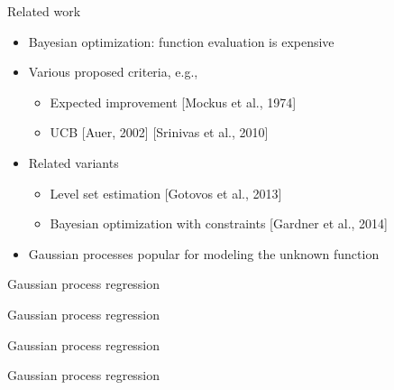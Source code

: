 \documentclass[xetex,10pt,mathserif,handout]{beamer}
\newlength\figureheight
\newlength\figurewidth
\newcommand{\qcite}[1]{{\small\color{gray}[#1]}}
\begin{document}
\begin{frame}{Related work}
\begin{itemize}
  \item<1-> Bayesian optimization: function evaluation is expensive
  \vspace{2em}
  \item<2-> Various proposed criteria, e.g.,
    \vspace{0.5em}
    \begin{itemize}
      \item Expected improvement \qcite{Mockus et al., 1974}
      \vspace{0.5em}
      \item UCB \qcite{Auer, 2002} \qcite{Srinivas et al., 2010}
    \end{itemize}
  \vspace{2em}
  \item<3-> Related variants
    \vspace{0.5em}
    \begin{itemize}
      \item Level set estimation \qcite{Gotovos et al., 2013}
      \vspace{0.5em}
      \item Bayesian optimization with constraints \qcite{Gardner et al., 2014}
    \end{itemize}
  \vspace{2em}
  \item<4-> Gaussian processes popular for modeling the unknown function
\end{itemize}
\end{frame}

\begin{frame}{Gaussian process regression}
\centering
\setlength\figurewidth{5in}
\setlength\figureheight{3.5in}

\end{frame}

\begin{frame}{Gaussian process regression}
\centering
\setlength\figurewidth{5in}
\setlength\figureheight{3.5in}

\end{frame}

\begin{frame}{Gaussian process regression}
\centering
\setlength\figurewidth{5in}
\setlength\figureheight{3.5in}

\end{frame}

\begin{frame}{Gaussian process regression}
\centering
\setlength\figurewidth{5in}
\setlength\figureheight{3.5in}

\end{frame}
\end{document}
